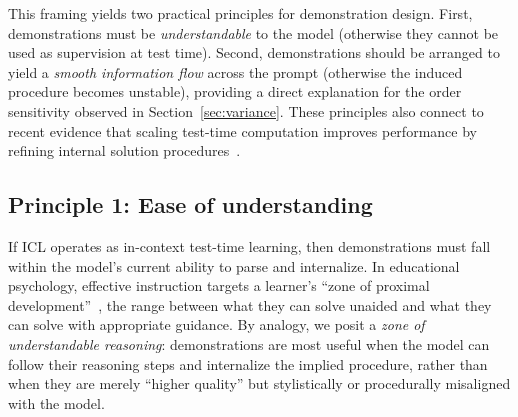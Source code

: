 \begin{table}[t]
\centering
{}
\caption{Procedural-corruption ablation on geometry. The larger drop at $n=128$ indicates that models use demonstration-specific procedures, not only answer labels or long-context activation.}
\label{tab:procedure_corruption_main}
\vspace{-8mm}
\end{table}

This framing yields two practical principles for demonstration design.
First, demonstrations must be \emph{understandable} to the model (otherwise they cannot be used as supervision at test time).
Second, demonstrations should be arranged to yield a \emph{smooth information flow} across the prompt (otherwise the induced procedure becomes unstable), providing a direct explanation for the order sensitivity observed in Section~\ref{sec:variance}.
These principles also connect to recent evidence that scaling test-time computation improves performance by refining internal solution procedures~\cite{snell2024scaling}.





\subsection{Principle 1: Ease of understanding}
\label{sec:understanding}
If ICL operates as in-context test-time learning, then demonstrations must fall within the model's current ability to parse and internalize.
In educational psychology, effective instruction targets a learner's ``zone of proximal development''~\cite{zoneofproximity}, the range between what they can solve unaided and what they can solve with appropriate guidance.
By analogy, we posit a \emph{zone of understandable reasoning}: demonstrations are most useful when the model can follow their reasoning steps and internalize the implied procedure, rather than when they are merely ``higher quality'' but stylistically or procedurally misaligned with the model.


